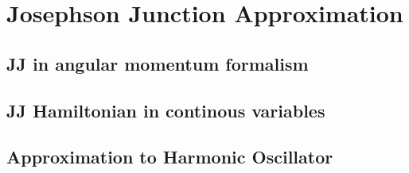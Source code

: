 \section{Josephson Junction Approximation}

\subsection{JJ in angular momentum formalism}


\subsection{JJ Hamiltonian in continous variables}

\subsection{Approximation to Harmonic Oscillator}

